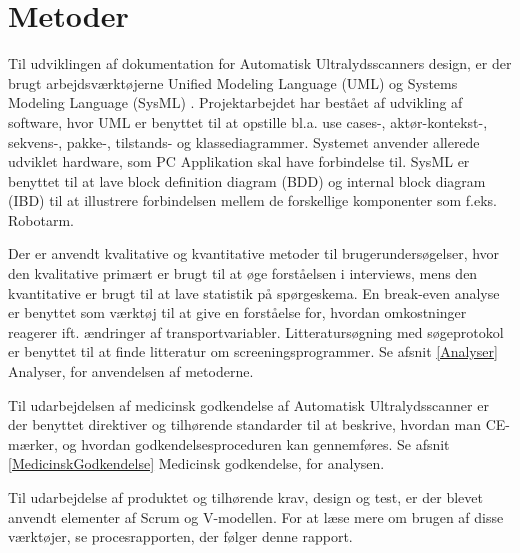\chapter{Metoder}\label{Metoder}

Til udviklingen af dokumentation for Automatisk Ultralydsscanners design, er der brugt arbejdsværktøjerne Unified Modeling Language (UML) \cite{UML}  og Systems Modeling Language (SysML) \cite{SysML}. Projektarbejdet har bestået af udvikling af software, hvor UML er benyttet til at opstille bl.a. use cases-, aktør-kontekst-, sekvens-, pakke-, tilstands- og klassediagrammer. Systemet anvender allerede udviklet hardware, som PC Applikation skal have forbindelse til. SysML er benyttet til at lave block definition diagram (BDD) og internal block diagram (IBD) til at illustrere forbindelsen mellem de forskellige komponenter som f.eks. Robotarm.

Der er anvendt kvalitative og kvantitative metoder \cite{MetoderBruger} til brugerundersøgelser, hvor den kvalitative primært er brugt til at øge forståelsen i interviews, mens den kvantitative er brugt til at lave statistik på spørgeskema. En break-even analyse \cite{Erhvervsokonomi} er benyttet som værktøj til at give en forståelse for, hvordan omkostninger reagerer ift. ændringer af transportvariabler. Litteratursøgning med søgeprotokol er benyttet til at finde litteratur om screeningsprogrammer. Se afsnit \ref{Analyser} Analyser, for anvendelsen af metoderne. 

Til udarbejdelsen af medicinsk godkendelse af Automatisk Ultralydsscanner er der benyttet direktiver og tilhørende standarder til at beskrive, hvordan man CE-mærker, og hvordan godkendelsesproceduren kan gennemføres.  Se afsnit \ref{MedicinskGodkendelse} Medicinsk godkendelse, for analysen. 

Til udarbejdelse af produktet og tilhørende krav, design og test, er der blevet anvendt elementer af Scrum og V-modellen. For at læse mere om brugen af disse værktøjer, se procesrapporten, der følger denne rapport.


